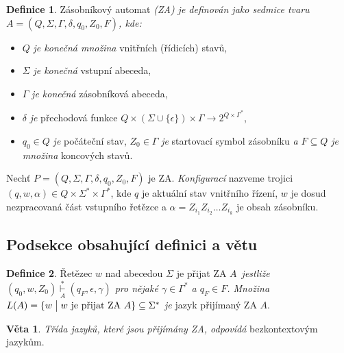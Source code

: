 \documentclass[a4paper,twocolumn,11pt]{article}[06-03-2022]
\theoremstyle{definition}
\newtheorem{theorem}{Definice}
\newtheorem{sentence}{Věta}
\begin{document}
\begin{theorem}\label{def1}
    Zásobníkový automat \emph{(ZA) je definován jako sedmice tvaru $A = (Q, \Sigma, \Gamma, \delta, q_0, Z_0, F)$, kde:} 
    \begin{itemize}
        \item $Q$ \emph{je konečná množina} vnitřních (řídicích) stavů,
        \item $\Sigma$ \emph{je konečná} vstupní abeceda,
        \item $\Gamma$ \emph{je konečná} zásobníková abeceda,
        \item $\delta$ \emph{je} přechodová funkce $Q \times (\Sigma \cup \{\epsilon\}) \times \Gamma \rightarrow 2^{Q \times \Gamma^\ast}$,
        \item $q_0 \in Q$ \emph{je} počáteční stav, $Z_0 \in \Gamma$ \emph{je} startovací symbol zásobníku \emph{a $F \subseteq Q$ je množina} koncových stavů.
    \end{itemize}
\end{theorem}
Nechť $P = (Q, \Sigma, \Gamma, \delta, q_0, Z_0, F)$ je ZA. \emph{Konfigurací} nazveme trojici $(q,w,\alpha) \in Q \times \Sigma^\ast \times \Gamma^\ast$, kde $q$ je aktuální stav vnitřního řízení, $w$ je dosud nezpracovaná část vstupního řetězce a $\alpha = Z_{i_1} Z_{i_2} \ldots Z_{i_k}$ je obsah zásobníku.

\subsection{Podsekce obsahující definici a větu}
\begin{theorem}\label{def2}
    Řetězec $w$ nad abecedou $\Sigma$ je přijat ZA $A$~\emph{jestliže $(q_0, w, Z_0) \overset{\ast}{\underset{A}{\vdash}} (q_F, \epsilon, \gamma)$ pro nějaké $\gamma \in \Gamma^\ast$ a $q_F \in F$.
    Množina $L(A) = \{w \bigm| w \textrm{ je přijat ZA } A \} \subseteq \Sigma^\ast$ je} jazyk přijímaný ZA $A$.
\end{theorem}
\begin{sentence}
    \emph{Třída jazyků, které jsou přijímány ZA, odpovídá} bezkontextovým jazykům.
\end{sentence}
\end{document}
